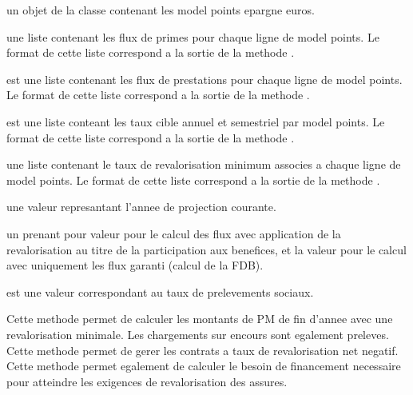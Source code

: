 \documentclass[a4paper]{book}
\begin{document}
\begin{Arguments}
\begin{ldescription}
\item[\code{x}] un objet de la classe  contenant les model points epargne euros.

\item[\code{tab\_prime}] une liste contenant les flux de primes pour chaque ligne de model points.
Le format de cette liste correspond a la sortie  de la methode .

\item[\code{tab\_prest}] est une liste contenant les flux de prestations pour chaque ligne de model points.
Le format de cette liste correspond a la sortie  de la methode .

\item[\code{tx\_cible}] est une liste conteant les taux cible annuel et semestriel par model points.
Le format de cette liste correspond a la sortie de la methode .

\item[\code{tx\_min}] une liste contenant le taux de revalorisation minimum associes a chaque ligne de model points.
Le format de cette liste correspond a la sortie de la methode .

\item[\code{an}] une valeur  represantant l'annee de projection courante.

\item[\code{method}] un  prenant pour valeur  pour le calcul
des flux avec application de la revalorisation au titre de la participation aux benefices,
et la valeur  pour le calcul avec uniquement les flux garanti (calcul de la FDB).

\item[\code{tx\_soc}] est une valeur  correspondant au taux de prelevements sociaux.
\end{ldescription}
\end{Arguments}
%
\begin{Details}\relax
Cette methode permet de calculer les montants de PM de fin d'annee avec une revalorisation
minimale. Les chargements sur encours sont egalement preleves. Cette methode permet de gerer les contrats a taux de
revalorisation net negatif. Cette methode permet egalement de calculer le besoin de financement necessaire
pour atteindre les exigences de revalorisation des assures.
\end{Details}
\end{document}
